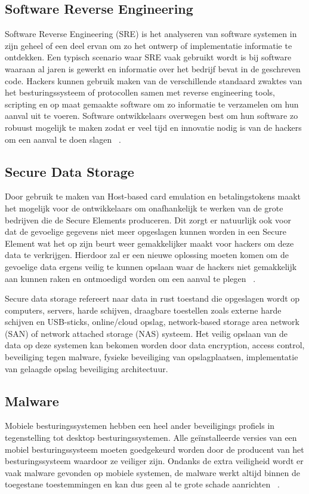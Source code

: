 \subsection{Software Reverse Engineering}
Software Reverse Engineering (SRE) is het analyseren van software systemen in zijn geheel of een deel ervan om zo het ontwerp of implementatie informatie te ontdekken. Een typisch scenario waar SRE vaak gebruikt wordt is bij software waaraan al jaren is gewerkt en informatie over het bedrijf bevat in de geschreven code. Hackers kunnen gebruik maken van de verschillende standaard zwaktes van het besturingssysteem of protocollen samen met reverse engineering tools, scripting en op maat gemaakte software om zo informatie te verzamelen om hun aanval uit te voeren. Software ontwikkelaars overwegen best om hun software zo robuust mogelijk te maken zodat er veel tijd en innovatie nodig is van de hackers om een aanval te doen slagen ~\autocite{Cryptomathic}.

\subsection{Secure Data Storage}
Door gebruik te maken van Host-based card emulation en betalingstokens maakt het mogelijk voor de ontwikkelaars om onafhankelijk te werken van de grote bedrijven die de Secure Elements produceren. Dit zorgt er natuurlijk ook voor dat de gevoelige gegevens niet meer opgeslagen kunnen worden in een Secure Element wat het op zijn beurt weer gemakkelijker maakt voor hackers om deze data te verkrijgen. Hierdoor zal er een nieuwe oplossing moeten komen om de gevoelige data ergens veilig te kunnen opslaan waar de hackers niet gemakkelijk aan kunnen raken en ontmoedigd worden om een aanval te plegen ~\autocite{Cryptomathic}.

Secure data storage refereert naar data in rust toestand die opgeslagen wordt op computers, servers, harde schijven, draagbare toestellen zoals externe harde schijven en USB-sticks, online/cloud opslag, network-based storage area network (SAN) of network attached storage (NAS) systeem. Het veilig opslaan van de data op deze systemen kan bekomen worden door data encryption, access control, beveiliging tegen malware, fysieke beveiliging van opslagplaatsen, implementatie  van gelaagde opslag beveiliging architectuur.

\subsection{Malware}
Mobiele besturingssystemen hebben een heel ander beveiligings profiels in tegenstelling tot desktop besturingssystemen. Alle geïnstalleerde versies van een mobiel besturingssysteem moeten goedgekeurd worden door de producent van het besturingssysteem waardoor ze veiliger zijn. Ondanks de extra veiligheid wordt er vaak malware gevonden op mobiele systemen, de malware werkt altijd binnen de toegestane toestemmingen en kan dus geen al te grote schade aanrichten ~\autocite{Cryptomathic}.

